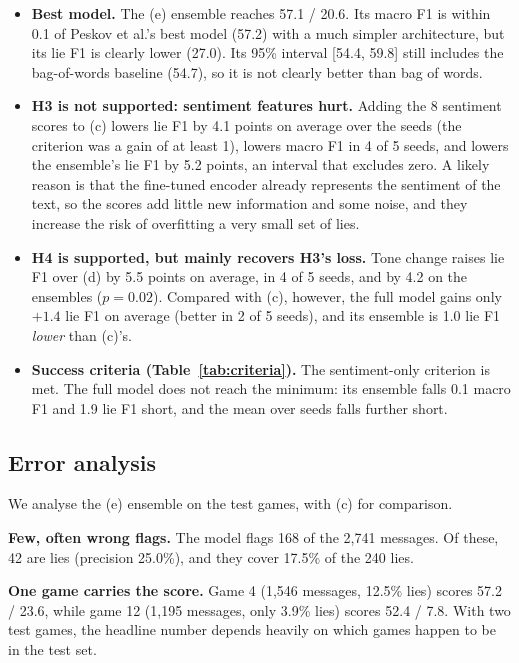 \documentclass[conference]{IEEEtran}
\begin{document}
\begin{itemize}
\item \textbf{Best model.} The (e) ensemble reaches 57.1 / 20.6. Its macro F1 is within 0.1 of Peskov et al.'s best model (57.2) with a much simpler architecture, but its lie F1 is clearly lower (27.0). Its 95\% interval [54.4, 59.8] still includes the bag-of-words baseline (54.7), so it is not clearly better than bag of words.
\item \textbf{H3 is not supported: sentiment features hurt.} Adding the 8 sentiment scores to (c) lowers lie F1 by 4.1 points on average over the seeds (the criterion was a gain of at least 1), lowers macro F1 in 4 of 5 seeds, and lowers the ensemble's lie F1 by 5.2 points, an interval that excludes zero. A likely reason is that the fine-tuned encoder already represents the sentiment of the text, so the scores add little new information and some noise, and they increase the risk of overfitting a very small set of lies.
\item \textbf{H4 is supported, but mainly recovers H3's loss.} Tone change raises lie F1 over (d) by 5.5 points on average, in 4 of 5 seeds, and by 4.2 on the ensembles ($p = 0.02$). Compared with (c), however, the full model gains only $+1.4$ lie F1 on average (better in 2 of 5 seeds), and its ensemble is 1.0 lie F1 \emph{lower} than (c)'s.
\item \textbf{Success criteria (Table~\ref{tab:criteria}).} The sentiment-only criterion is met. The full model does not reach the minimum: its ensemble falls 0.1 macro F1 and 1.9 lie F1 short, and the mean over seeds falls further short.
\end{itemize}

\subsection{Error analysis}
\label{sec:res-err}
We analyse the (e) ensemble on the test games, with (c) for comparison.

\textbf{Few, often wrong flags.} The model flags 168 of the 2,741 messages. Of these, 42 are lies (precision 25.0\%), and they cover 17.5\% of the 240 lies.

\textbf{One game carries the score.} Game 4 (1,546 messages, 12.5\% lies) scores 57.2 / 23.6, while game 12 (1,195 messages, only 3.9\% lies) scores 52.4 / 7.8. With two test games, the headline number depends heavily on which games happen to be in the test set.
\end{document}
